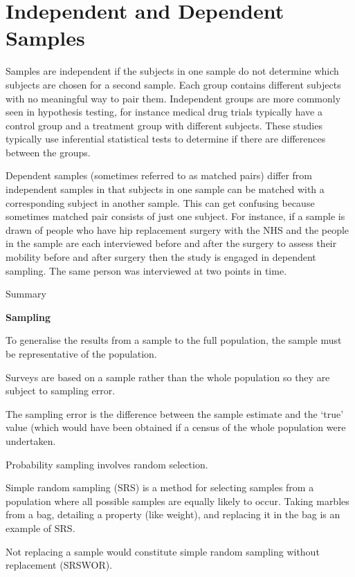 \documentclass[
]{book}
\begin{document}
\hypertarget{independent-and-dependent-samples}{%
\section{Independent and Dependent Samples}\label{independent-and-dependent-samples}}

Samples are independent if the subjects in one sample do not determine which subjects are chosen for a second sample. Each group contains different subjects with no meaningful way to pair them. Independent groups are more commonly seen in hypothesis testing, for instance medical drug trials typically have a control group and a treatment group with different subjects. These studies typically use inferential statistical tests to determine if there are differences between the groups.

Dependent samples (sometimes referred to as matched pairs) differ from independent samples in that subjects in one sample can be matched with a corresponding subject in another sample. This can get confusing because sometimes matched pair consists of just one subject. For instance, if a sample is drawn of people who have hip replacement surgery with the NHS and the people in the sample are each interviewed before and after the surgery to assess their mobility before and after surgery then the study is engaged in dependent sampling. The same person was interviewed at two points in time.

Summary

\textbf{Sampling}

To generalise the results from a sample to the full population, the sample must be representative of the population.

Surveys are based on a sample rather than the whole population so they are subject to sampling error.

The sampling error is the difference between the sample estimate and the `true' value (which would have been obtained if a census of the whole population were undertaken.

Probability sampling involves random selection.

Simple random sampling (SRS) is a method for selecting samples from a population where all possible samples are equally likely to occur. Taking marbles from a bag, detailing a property (like weight), and replacing it in the bag is an example of SRS.

Not replacing a sample would constitute simple random sampling without replacement (SRSWOR).
\end{document}
